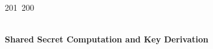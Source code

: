 201~200~\documentclass{article}
\begin{document}
\begin{lstlisting}[language=Python, caption=Key Pair Generation]
	                                                                                                                                                                                                                                                                                                	                                                                                                                                        	    	                                                                                                	                                                                                                                                                                                                                                                                                                                                	                                                                        	                                                                        	                                                                                                                                        	                                                                                                                                                                                                            \end{lstlisting}

	                                                                                                                                                                                                                                                                                                	                                                                                                                                        	    	                                                                                                	                                                                                                                                                                                                                                                                                                                                	                                                                        	                                                                        	                                                                                                                                        	                                                                                                                                                                                                            \paragraph{Shared Secret Computation and Key Derivation}
\end{document}
